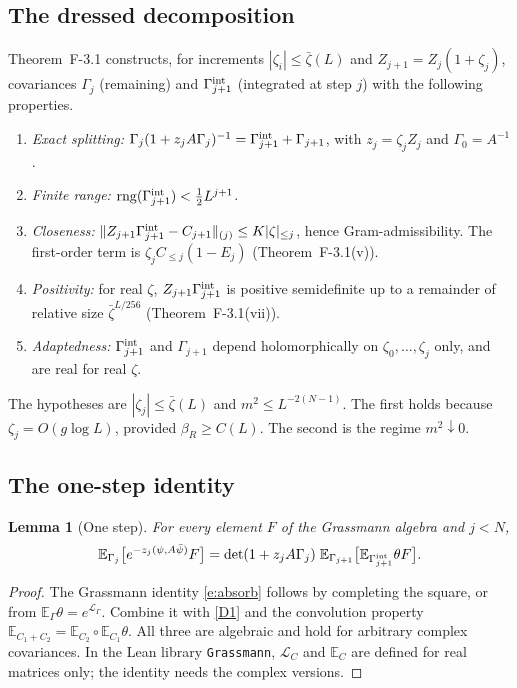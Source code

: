 \documentclass[11pt]{amsart}
\newtheorem{lemma}[theorem]{Lemma}
\theoremstyle{definition}
\theoremstyle{remark}
\numberwithin{equation}{section}
\newcommand{\E}{\mathbb{E}}
\newcommand{\cL}{\mathcal{L}}
\newcommand{\rng}{\operatorname{rng}}
\begin{document}
\subsection{The dressed decomposition}
Theorem~F-3.1 constructs, for increments $|\zeta_i|\le\bar\zeta(L)$ and
$Z_{j+1}=Z_j(1+\zeta_j)$, covariances $\Gamma_j$ (remaining) and $\Gamma^{\rm int}_{j+1}$
(integrated at step $j$) with the following properties.
\begin{enumerate}[label=(D\arabic*)]
\item\label{D1} \emph{Exact splitting:}
  $\Gamma_j(1+z_jA\Gamma_j)^{-1}=\Gamma^{\rm int}_{j+1}+\Gamma_{j+1}$, with $z_j=\zeta_jZ_j$ and
  $\Gamma_0=A^{-1}$.
\item\label{D2} \emph{Finite range:} $\rng(\Gamma^{\rm int}_{j+1})<\frac12L^{j+1}$.
\item\label{D3} \emph{Closeness:} $\|Z_{j+1}\Gamma^{\rm int}_{j+1}-C_{j+1}\|_{(j)}\le K|\zeta|_{\le j}$,
  hence Gram-admissibility. The first-order term is $\zeta_jC_{\le j}(1-E_j)$ (Theorem~F-3.1(v)).
\item\label{D4} \emph{Positivity:} for real $\zeta$, $Z_{j+1}\Gamma^{\rm int}_{j+1}$ is
  positive semidefinite up to a remainder of relative size $\bar\zeta^{L/256}$
  (Theorem~F-3.1(vii)).
\item\label{D5} \emph{Adaptedness:} $\Gamma^{\rm int}_{j+1}$ and $\Gamma_{j+1}$ depend
  holomorphically on $\zeta_0,\dots,\zeta_j$ only, and are real for real $\zeta$.
\end{enumerate}
The hypotheses are $|\zeta_j|\le\bar\zeta(L)$ and $m^2\le L^{-2(N-1)}$. The first holds because
$\zeta_j=O(g\log L)$, provided $\beta_R\ge C(L)$. The second is the regime $m^2\downarrow0$.

\subsection{The one-step identity}
\label{sec:onestep-id}
\begin{lemma}[One step]\label{lem:onestep}
For every element $F$ of the Grassmann algebra and $j<N$,
\[
  \E_{\Gamma_j}\bigl[e^{-z_j(\psi,A\bar\psi)}F\bigr]=\det(1+z_jA\Gamma_j)\;
  \E_{\Gamma_{j+1}}\bigl[\E_{\Gamma^{\rm int}_{j+1}}\theta F\bigr].
\]
\end{lemma}

\begin{proof}
The Grassmann identity \eqref{e:absorb} follows by completing the square, or from
$\E_\Gamma\theta=e^{\cL_\Gamma}$. Combine it with \ref{D1} and the convolution property
$\E_{C_1+C_2}=\E_{C_2}\circ\E_{C_1}\theta$. All three are algebraic and hold for arbitrary
complex covariances. In the Lean library \texttt{Grassmann}, $\cL_C$ and $\E_C$ are defined for
real matrices only; the identity needs the complex versions.
\end{proof}
\end{document}
